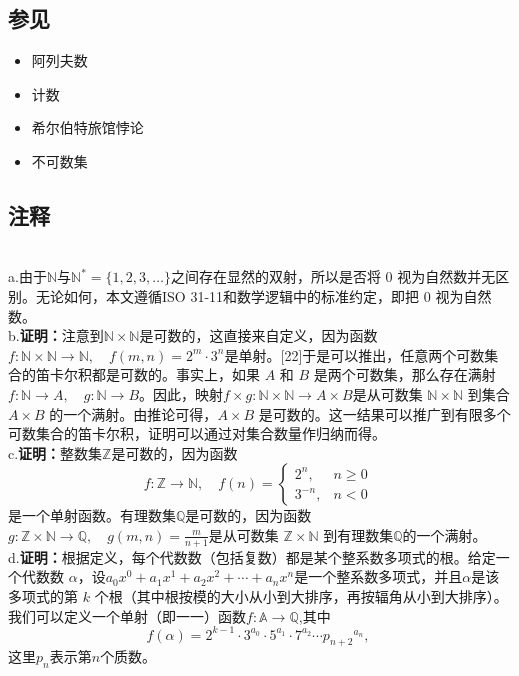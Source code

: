 \subsection{参见}
\begin{itemize}
\item 阿列夫数
\item 计数
\item 希尔伯特旅馆悖论
\item 不可数集
\end{itemize}
\subsection{注释}\\
a.由于$\mathbb{N}$与$\mathbb{N}^{*}=\{1,2,3,\dots\}$之间存在显然的双射，所以是否将 0 视为自然数并无区别。无论如何，本文遵循ISO 31-11和数学逻辑中的标准约定，即把 0 视为自然数。\\
b.\textbf{证明：}注意到$\mathbb{N} \times \mathbb{N}$是可数的，这直接来自定义，因为函数$f : \mathbb{N} \times \mathbb{N} \to \mathbb{N}, \quad f(m,n) = 2^{m}\cdot 3^{n}$是单射。[22]于是可以推出，任意两个可数集合的笛卡尔积都是可数的。事实上，如果 $A$ 和 $B$ 是两个可数集，那么存在满射$
f : \mathbb{N} \to A, \quad g : \mathbb{N} \to B$。因此，映射$f \times g : \mathbb{N} \times \mathbb{N} \to A \times B$是从可数集 $\mathbb{N} \times \mathbb{N}$ 到集合 $A \times B$ 的一个满射。由推论可得，$A \times B$ 是可数的。这一结果可以推广到有限多个可数集合的笛卡尔积，证明可以通过对集合数量作归纳而得。\\
c.\textbf{证明：}整数集$\mathbb{Z}$是可数的，因为函数
$$
f : \mathbb{Z} \to \mathbb{N}, \quad 
f(n) = 
\begin{cases} 
2^{n}, & n \geq 0 \\[6pt] 
3^{-n}, & n < 0 
\end{cases}~
$$
是一个单射函数。有理数集$\mathbb{Q}$是可数的，因为函数$g : \mathbb{Z} \times \mathbb{N} \to \mathbb{Q}, \quad g(m,n) = \frac{m}{n+1}$是从可数集 $\mathbb{Z} \times \mathbb{N}$ 到有理数集$\mathbb{Q}$的一个满射。\\
d.\textbf{证明：}根据定义，每个代数数（包括复数）都是某个整系数多项式的根。给定一个代数数 $\alpha$，设$a_{0}x^{0} + a_{1}x^{1} + a_{2}x^{2} + \cdots + a_{n}x^{n}$是一个整系数多项式，并且$\alpha$是该多项式的第 $k$ 个根（其中根按模的大小从小到大排序，再按辐角从小到大排序）。我们可以定义一个单射（即一一）函数$f : \mathbb{A} \to \mathbb{Q}$,其中
$$
f(\alpha) = 2^{k-1} \cdot 3^{a_{0}} \cdot 5^{a_{1}} \cdot 7^{a_{2}} \cdots {p_{n+2}}^{a_{n}},~
$$
这里$p_{n}$表示第$n$个质数。\\
